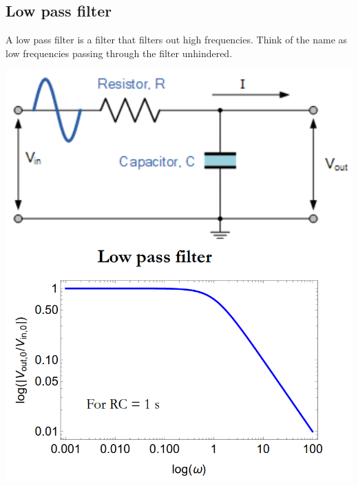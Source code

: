 \documentclass[11pt]{article}
\begin{document}
\subsection{Low pass filter}
\label{sec:org0be4151}
A low pass filter is a filter that filters out high frequencies. Think of the name as low frequencies passing through the filter unhindered.

\begin{center}
\includegraphics[width=.9\linewidth]{./images/low-pass-filter.png}
\end{center}
\end{document}
